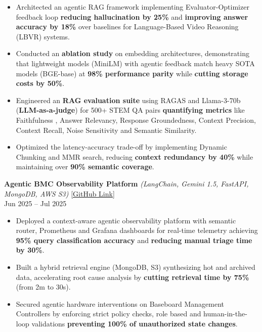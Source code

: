 \documentclass[letterpaper,10.5pt]{extarticle}
\begin{document}
\begin{itemize}[leftmargin=12pt, topsep=1pt, itemsep=0pt, parsep=0pt]
    \item Architected an agentic RAG framework implementing Evaluator-Optimizer feedback loop \textbf{reducing hallucination by 25\%} and \textbf{improving answer accuracy by 18\%} over baselines for Language-Based Video Reasoning (LBVR) systems.
    \item Conducted an \textbf{ablation study} on embedding architectures, demonstrating that lightweight models (MiniLM) with agentic feedback match heavy SOTA models (BGE-base) at \textbf{98\% performance parity} while \textbf{cutting storage costs by 50\%}.
    \item Engineered an \textbf{RAG evaluation suite} using RAGAS and Llama-3-70b (\textbf{LLM-as-a-judge}) for 500+ STEM QA pairs \textbf{quantifying metrics} like Faithfulness , Answer Relevancy, Response Groundedness, Context Precision, Context Recall, Noise Sensitivity and Semantic Similarity.
    \item Optimized the latency-accuracy trade-off by implementing Dynamic Chunking and MMR search, reducing \textbf{context redundancy by 40\%} while maintaining over \textbf{90\% semantic coverage}.
\end{itemize}

\vspace{4pt}

\noindent\textbf{Agentic BMC Observability Platform}
\textit{(LangChain, Gemini 1.5, FastAPI, MongoDB, AWS S3)} \hfill \href{https://github.com/slowloris-98/Agentic-Oberservability-BMC}{[GitHub Link]} \\
Jun 2025 -- Jul 2025 

\begin{itemize}[leftmargin=12pt, topsep=1pt, itemsep=0pt, parsep=0pt]
    \item Deployed a context-aware agentic observability platform with semantic router, Prometheus and Grafana dashboards for real-time telemetry achieving \textbf{95\% query classification accuracy} and \textbf{reducing manual triage time by 30\%}.
    \item Built a hybrid retrieval engine (MongoDB, S3) synthesizing hot and archived data, accelerating root cause analysis by \textbf{cutting retrieval time by 75\%} (from 2m to 30s).
    \item Secured agentic hardware interventions on Baseboard Management Controllers by enforcing strict policy checks, role based and human-in-the-loop validations \textbf{preventing 100\% of unauthorized state changes}.
\end{itemize}
\end{document}
